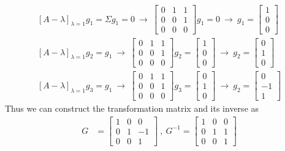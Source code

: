 \documentclass[twoside]{article}
\begin{document}
\begin{align*}
 \left[ A - \lambda \right]_{\lambda = 1} g_1 = \Sigma g_1 = 0 \ \rightarrow \ 
 \left[ \begin{array}{ccc} 0 & 1 & 1 \\ 0 & 0 & 1 \\ 0 & 0 & 0 \end{array} \right] g_1 = 0 \ \rightarrow \ g_1 =  
 \left[ \begin{array}{c} 1 \\ 0  \\ 0  \end{array} \right]
 \\
  \left[ A - \lambda \right]_{\lambda = 1} g_2 = g_1 \ \rightarrow \
  \left[ \begin{array}{ccc} 0 & 1 & 1 \\ 0 & 0 & 1 \\ 0 & 0 & 0 \end{array} \right] g_2 =  \left[ \begin{array}{c} 1 \\ 0  \\ 0  \end{array} \right] \ \rightarrow \ 
  g_2 =   \left[ \begin{array}{c} 0 \\ 1  \\ 0  \end{array} \right]
  \\
  \left[ A - \lambda \right]_{\lambda = 1} g_3 = g_1 \ \rightarrow \
  \left[ \begin{array}{ccc} 0 & 1 & 1 \\ 0 & 0 & 1 \\ 0 & 0 & 0 \end{array} \right] g_3 =  \left[ \begin{array}{c} 0 \\ 1  \\ 0  \end{array} \right] \ \rightarrow \ 
  g_2 =   \left[ \begin{array}{c} 0 \\ -1  \\ 1  \end{array} \right]
\end{align*}
%
Thus we can construct the transformation matrix and its inverse as
\begin{align*}
 G &= \left[ \begin{array}{ccc} 1 & 0 & 0 \\ 0 & 1 & -1  \\ 0 & 0 & 1  \end{array} \right]
 \  , \ 
 G^{-1} = \left[ \begin{array}{ccc} 1 & 0 & 0 \\ 0 & 1 & 1  \\ 0 & 0 & 1  \end{array} \right]
\end{align*}
\end{document}
